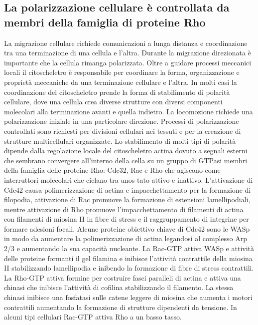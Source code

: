 \subsection{La polarizzazione cellulare \`e controllata da membri della famiglia di proteine Rho}
La migrazione cellulare richiede comunicazioni a lunga distanza e coordinazione tra una terminazione di una cellula e l'altra. Durante la migrazione direzionata \`e importante che la
cellula rimanga polarizzata. Oltre a guidare processi meccanici locali il citoscheletro \`e responsabile per coordinare la forma, organizzazione e propriet\`a meccaniche da una
terminazione cellulare e l'altra. In molti casi la coordinazione del citoscheletro prende la forma di stabilimento di polarit\`a cellulare, dove una cellula crea diverse strutture con
diversi componenti molecolari alla terminazione avanti e quella indietro. La locomozione richiede una polarizzazione iniziale in una particolare direzione. Processi di polarizzazione 
controllati sono richiesti per divisioni cellulari nei tessuti e per la creazione di strutture multicellulari organizzate. Lo stabilimento di molti tipi di polarit\`a dipende dalla
regolazione locale del citoscheletro actina dovuto a segnali esterni che sembrano convergere all'interno della cella su un gruppo di GTPasi membri della famiglia delle proteine Rho: 
Cdc32, Rac e Rho che agiscono come interruttori molecolari che ciclano tra unos tato attivo e inattivo. L'attivazione di Cdc42 causa polimerizzazione di actina e impacchettamento per
la formazione di filopodia, attivazione di Rac promuove la formazione di estensioni lamellipodiali, mentre attivazione di Rho promuove l'impacchettamento di filamenti di actina con 
filamenti di miosina II in fibre di stress e il raggruppamento di integrine per formare adesioni focali. Alcune proteine obiettivo chiave di Cdc42 sono le WASp in modo da aumentare la 
polimerizzazione di actina legandosi al complesso Arp 2/3 e aumentando la sua capacit\`a nucleante. La Rac-GTP attiva WASp e attivit\`a delle proteine formanti il gel filamina e inibisce
l'attivit\`a contrattile della miosina II stabilizzando lamellipodia e inibendo la formazione di fibre di stress contrattili. La Rho-GTP attiva formine per costruire fasci paralleli di
actina e attiva una chinasi che inibisce l'attivit\`a di cofilina stabilizzando il filamento. La stessa chinasi inibisce una fosfatasi sulle catene leggere di miosina che aumenta 
i motori contrattili aumentando la formazione di strutture dipendenti da tensione. In alcuni tipi cellulari Rac-GTP attiva Rho a un basso tasso.
